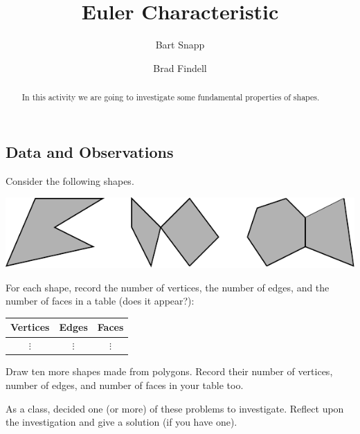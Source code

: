 \documentclass{ximera}
\title{Euler Characteristic}
\author{Bart Snapp \and Brad Findell}
\begin{document}
\begin{abstract}
In this activity we are going to investigate some fundamental
properties of shapes.
\end{abstract}
\maketitle

\subsection{Data and Observations}


\begin{question}
Consider the following shapes.
\begin{image}
\includegraphics{eulerCharPoly}
\end{image}
For each shape, record the number of vertices, the number of edges,
and the number of faces in a table (does it appear?):
\begin{center}
\begin{tabular}{c|c|c}
Vertices & Edges & Faces\\
\hline\hline
 $\vdots$  & $\vdots$  & $\vdots$  \\ 
\end{tabular}
\end{center}
\begin{freeResponse}
\end{freeResponse}
\end{question}

\newpage

\begin{question}
Draw ten more shapes made from polygons. Record their number of
vertices, number of edges, and number of faces in your table too.
\begin{freeResponse}
\end{freeResponse}
\end{question}


\begin{problem}
As a class, decided one (or more) of these problems to
investigate. Reflect upon the investigation and give a solution (if
you have one).
\begin{freeResponse}
\end{freeResponse}
\end{problem}
\end{document}
